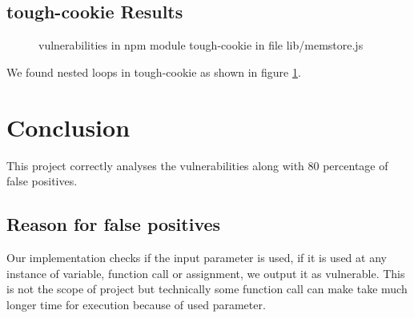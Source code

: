 \documentclass[authoryear,preprint]{sigplanconf}
\begin{document}
\subsection{tough-cookie Results}

\begin{figure}[ht]
\caption[vulnerablilities in npm module tough-cookie in file lib/memstore.js]{\label{f:cookie}vulnerabilities in npm module tough-cookie in file lib/memstore.js}
\end{figure}

We found nested loops in tough-cookie as shown in figure \ref{f:cookie}.

\section{Conclusion}

This project correctly analyses the vulnerabilities along with 80 percentage of false positives. 

\subsection{Reason for false positives}
Our implementation checks if the input parameter is used, if it is used at any instance of variable, function call or assignment, we output it as vulnerable. This is not the scope of project but technically some function call can make take much longer time for execution because of used parameter.
\end{document}
